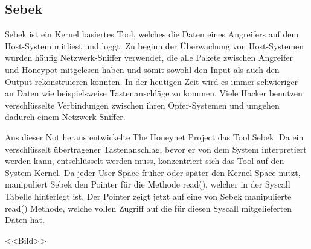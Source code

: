 \subsection{Sebek}
Sebek ist ein Kernel basiertes Tool, welches die Daten eines Angreifers auf dem Host-System mitliest und loggt. Zu beginn der Überwachung von Host-Systemen wurden häufig Netzwerk-Sniffer verwendet, die alle Pakete zwischen Angreifer und Honeypot mitgelesen haben und somit sowohl den Input als auch den Output rekonstruieren konnten. In der heutigen Zeit wird es immer schwieriger an Daten wie beispielsweise Tastenanschläge zu kommen. Viele Hacker benutzen verschlüsselte Verbindungen zwischen ihren Opfer-Systemen und umgehen dadurch einem Netzwerk-Sniffer. 

Aus dieser Not heraus entwickelte The Honeynet Project das Tool Sebek. Da ein verschlüsselt übertragener Tastenanschlag, bevor er von dem System interpretiert werden kann, entschlüsselt werden muss, konzentriert sich das Tool auf den System-Kernel. Da jeder User Space früher oder später den Kernel Space nutzt, manipuliert Sebek den Pointer für die Methode read(), welcher in der Syscall Tabelle hinterlegt ist. Der Pointer zeigt jetzt auf eine von Sebek manipulierte read() Methode, welche vollen Zugriff auf die für diesen Syscall mitgelieferten Daten hat.

<<Bild>>

\cite{project.2003b}